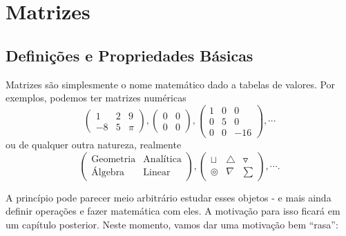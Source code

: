 \chapter{Matrizes}
\section{Definições e Propriedades Básicas}

Matrizes são simplesmente o nome matemático dado a tabelas de valores. Por exemplos, podemos ter matrizes numéricas
\[\begin{pmatrix}
1 & 2 & 9\\
-8 & 5 & \pi
\end{pmatrix}, \begin{pmatrix}
0 & 0\\
0 & 0
\end{pmatrix},
\begin{pmatrix}
1 & 0 & 0\\
0 & 5 & 0\\
0 & 0 & -16
\end{pmatrix},\cdots\] ou de qualquer outra natureza, realmente
\[\begin{pmatrix}
\text{Geometria} & \text{Analítica}\\
\text{Álgebra} & \text{Linear}
\end{pmatrix},\begin{pmatrix}
\sqcup & \triangle & \triangledown\\
\circledcirc & \nabla & \sum
\end{pmatrix},\cdots.\]

A princípio pode parecer meio arbitrário estudar esses objetos - e mais ainda definir operações e fazer matemática com eles. A motivação para isso ficará em um capítulo posterior. Neste momento, vamos dar uma motivação bem ``rasa'':

